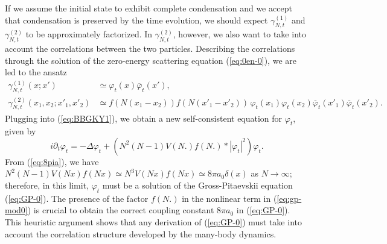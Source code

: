 \documentclass[11pt,a4paper]{article}
\begin{document}
If we assume the initial state to exhibit complete condensation and we accept that condensation is preserved by the time evolution, we should expect $\gamma^{(1)}_{N,t}$ and $\gamma^{(2)}_{N,t}$ to be approximately factorized. In $\gamma^{(2)}_{N,t}$, however, we also want to take into account the correlations between the two particles. Describing the correlations through the solution of the zero-energy scattering equation (\ref{eq:0en-0}), we are led to the ansatz
%
\begin{equation}\label{eq:ans-mod} \begin{split} 
\gamma^{(1)}_{N,t} (x;x') &\simeq \varphi_t (x) \overline{\varphi}_t (x'), \\
\gamma^{(2)}_{N,t} (x_1, x_2; x'_1, x'_2) &\simeq  f (N (x_1 - x_2)) f (N
(x'_1- x'_2)) \, \varphi_t (x_1)  \varphi_t (x_2) \overline{\varphi}_t
(x'_1) \overline{\varphi}_t (x'_2).
\end{split} \end{equation}
Plugging into (\ref{eq:BBGKY1}), we obtain a new self-consistent equation for $\varphi_t$,  given by
\begin{equation}\label{eq:gp-mod0} i\partial_t \varphi_t = -\Delta \varphi_t
+ \left(N^2 (N-1) V(N.) f(N.) * |\varphi_t|^2 \right) \varphi_t.
\end{equation}
{F}rom (\ref{eq:8pia}), we have $N^2 (N-1) V(Nx) f(Nx) \simeq N^3 V(Nx) f(Nx) \simeq 8\pi a_0 \delta (x)$ as $N \to \infty$; therefore, in this limit, $\varphi_t$ must be a solution of the Gross-Pitaevskii equation (\ref{eq:GP-0}). The presence of the factor $f(N.)$ in the nonlinear term in (\ref{eq:gp-mod0}) is crucial to obtain the correct coupling constant $8\pi a_0$ in (\ref{eq:GP-0}). This heuristic argument shows that any derivation of (\ref{eq:GP-0}) must take into account the correlation structure developed by the many-body dynamics. 
 
\end{document}
